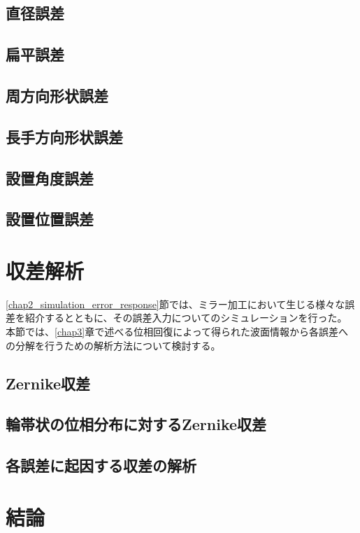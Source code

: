 \subsection{直径誤差}

\subsection{扁平誤差}

\subsection{周方向形状誤差}

\subsection{長手方向形状誤差}

\subsection{設置角度誤差}

\subsection{設置位置誤差}


\clearpage
\newpage


\clearpage
\newpage
\section{収差解析}
\label{chap2_simulation_zernike_analysis}

\ref{chap2_simulation_error_response}節では、ミラー加工において生じる様々な誤差を紹介するとともに、その誤差入力についてのシミュレーションを行った。
本節では、\ref{chap3}章で述べる位相回復によって得られた波面情報から各誤差への分解を行うための解析方法について検討する。

\subsection{Zernike収差}

\subsection{輪帯状の位相分布に対するZernike収差}


\subsection{各誤差に起因する収差の解析}



\section{結論}
\label{chap2_conclusion}



